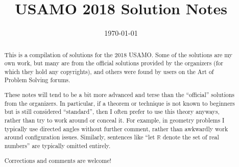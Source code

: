\documentclass[11pt]{scrartcl}
\title{USAMO 2018 Solution Notes}
\date{\today}
\begin{document}
\maketitle

\begin{abstract}
This is a compilation of solutions
for the 2018 USAMO.
Some of the solutions are my own work,
but many are from the official solutions provided by the organizers
(for which they hold any copyrights),
and others were found by users on the Art of Problem Solving forums.

These notes will tend to be a bit more advanced and terse than the ``official''
solutions from the organizers.
In particular, if a theorem or technique is not known to beginners
but is still considered ``standard'', then I often prefer to
use this theory anyways, rather than try to work around or conceal it.
For example, in geometry problems I typically use directed angles
without further comment, rather than awkwardly work around configuration issues.
Similarly, sentences like ``let $\mathbb{R}$ denote the set of real numbers''
are typically omitted entirely.

Corrections and comments are welcome!
\end{abstract}

\tableofcontents
\newpage

\addtocounter{section}{-1}
\end{document}
